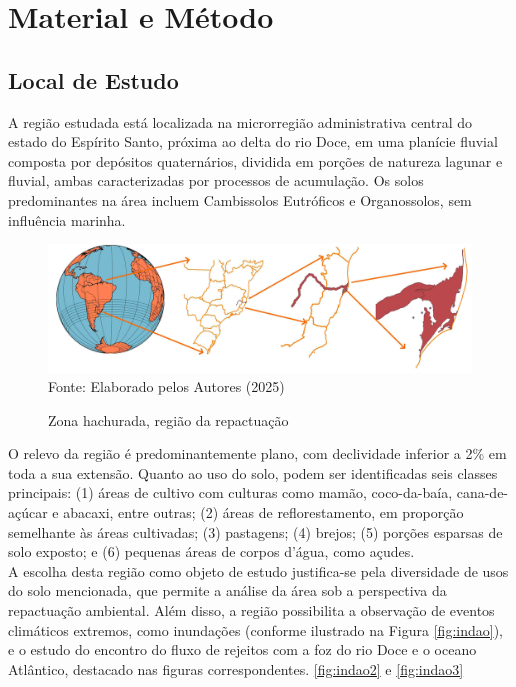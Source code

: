 
\section{Material e Método}

 \subsection*{Local de Estudo}


  \hspace*{1.25 cm}  A região estudada está localizada na microrregião administrativa central do estado do Espírito Santo, próxima ao delta do rio Doce, em uma planície fluvial composta por depósitos quaternários, dividida em porções de natureza lagunar e fluvial, ambas caracterizadas por processos de acumulação. Os solos predominantes na área incluem Cambissolos Eutróficos e Organossolos, sem influência marinha.\\
     \begin{figure}
	\begin{center}
		\centering \small \caption{Zona hachurada, região da repactuação}
		\includegraphics[width=0.96\linewidth]{FIGURAS/Localizacao}
		\label{fig:localizacado}\\{Fonte: Elaborado pelos Autores (2025)}
	\end{center}
\end{figure}
  \hspace*{1.25 cm}  O relevo da região é predominantemente plano, com declividade inferior a 2\% em toda a sua extensão. Quanto ao uso do solo, podem ser identificadas seis classes principais: (1) áreas de cultivo com culturas como mamão, coco-da-baía, cana-de-açúcar e abacaxi, entre outras; (2) áreas de reflorestamento, em proporção semelhante às áreas cultivadas; (3) pastagens; (4) brejos; (5) porções esparsas de solo exposto; e (6) pequenas áreas de corpos d’água, como açudes. \\
%
  \hspace*{1.25 cm} A escolha desta região como objeto de estudo justifica-se pela diversidade de usos do solo mencionada, que permite a análise da área sob a perspectiva da repactuação ambiental. Além disso, a região possibilita a observação de eventos climáticos extremos, como inundações (conforme ilustrado na Figura \ref{fig:indao}), e o estudo do encontro do fluxo de rejeitos com a foz do rio Doce e o oceano Atlântico, destacado nas figuras correspondentes. \ref{fig:indao2} e \ref{fig:indao3}\\  
